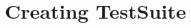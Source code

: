 \hypertarget{group___creating_test_suite}{
\section{Creating TestSuite}
\label{group___creating_test_suite}
}
